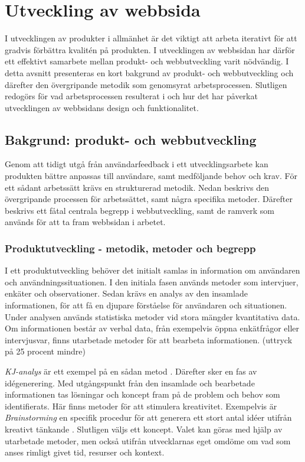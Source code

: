 \chapter{Utveckling av webbsida}
\label{sec: webb}

I utvecklingen av produkter i allmänhet är det viktigt att arbeta iterativt för att gradvis förbättra kvalitén på produkten. I utvecklingen av webbsidan har därför ett effektivt samarbete mellan produkt- och webbutveckling varit nödvändig. I detta avsnitt presenteras en kort bakgrund av produkt- och webbutveckling och därefter den övergripande metodik som genomsyrat arbetsprocessen. Slutligen redogörs för vad arbetsprocessen resulterat i och hur det har påverkat utvecklingen av webbsidans design och funktionalitet.  

\section{Bakgrund: produkt- och webbutveckling}
Genom att tidigt utgå från användarfeedback i ett utvecklingsarbete kan produkten bättre anpassas till användare, samt medföljande behov och krav. För ett sådant arbetssätt krävs en strukturerad metodik. Nedan beskrivs den övergripande processen för arbetssättet, samt några specifika metoder. Därefter beskrivs ett fåtal centrala begrepp i webbutveckling, samt de ramverk som används för att ta fram webbsidan i arbetet. 





\subsection{Produktutveckling - metodik, metoder och begrepp}
I ett produktutveckling behöver det initialt samlas in information om användaren och användningssituationen. I den initiala fasen används metoder som intervjuer, enkäter och observationer. Sedan krävs en analys av den insamlade informationen, för att få en djupare förståelse för användaren och situationen. Under analysen används statistiska metoder vid stora mängder kvantitativa data. Om informationen består av verbal data, från exempelvis öppna enkätfrågor eller intervjusvar, finns utarbetade metoder för att bearbeta informationen.
(uttryck på 25 procent mindre)


\emph{KJ-analys} är ett exempel på en sådan metod \cite{kj}. Därefter sker en fas av idégenerering. Med utgångspunkt från den insamlade och bearbetade informationen tas lösningar och koncept fram på de problem och behov som identifierats. Här finns metoder för att stimulera kreativitet. Exempelvis är \emph{Brainstorming} en specifik procedur för att generera ett stort antal idéer utifrån kreativt tänkande \cite{design}. Slutligen väljs ett koncept. Valet kan göras med hjälp av utarbetade metoder, men också utifrån utvecklarnas eget omdöme om vad som anses rimligt givet tid, resurser och kontext. 

